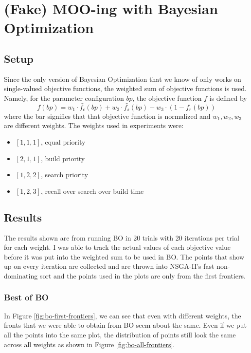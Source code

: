 \section{(Fake) MOO-ing with Bayesian Optimization}

\subsection{Setup}

Since the only version of Bayesian Optimization that we know of only works on single-valued objective functions, the weighted sum of objective functions is used. Namely, for the parameter configuration \(bp\), the objective function \(f\) is defined by
\[
    f(bp) = w_1 \cdot \bar{f_c}(bp) + w_2 \cdot \bar{f_s}(bp) + w_3 \cdot (1 - f_r(bp))
\]
where the bar signifies that that objective function is normalized and \(w_1, w_2, w_3\) are different weights. The weights used in experiments were:
\begin{itemize}
    \item \([1, 1, 1]\), equal priority
    \item \([2, 1, 1]\), build priority
    \item \([1, 2, 2]\), search priority
    \item \([1, 2, 3]\), recall over search over build time
\end{itemize}

\subsection{Results}

The results shown are from running BO in 20 trials with 20 iterations per trial for each weight. I was able to track the actual values of each objective value before it was put into the weighted sum to be used in BO. The points that show up on every iteration are collected and are thrown into NSGA-II's fast non-dominating sort and the points used in the plots are only from the first frontiers.

\subsubsection{Best of BO}

In Figure \ref{fig:bo-first-frontiers}, we can see that even with different weights, the fronts that we were able to obtain from BO seem about the same. Even if we put all the points into the same plot, the distribution of points still look the same across all weights as shown in Figure \ref{fig:bo-all-frontiers}.


